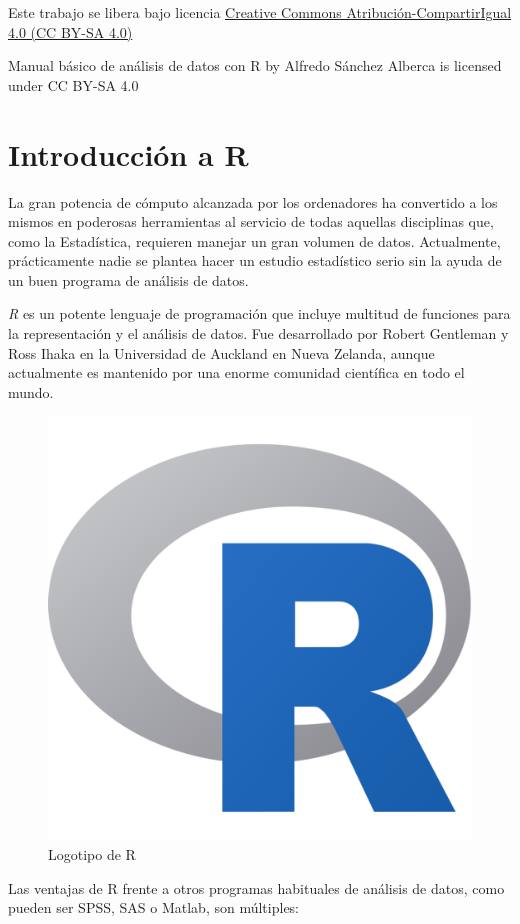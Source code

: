 \documentclass[
]{book}
\theoremstyle{definition}
\theoremstyle{definition}
\theoremstyle{definition}
\theoremstyle{definition}
\theoremstyle{remark}
\begin{document}
Este trabajo se libera bajo licencia \href{https://creativecommons.org/licenses/by-sa/4.0/deed.es}{Creative Commons Atribución-CompartirIgual 4.0 (CC BY-SA 4.0)}

Manual básico de análisis de datos con R by Alfredo Sánchez Alberca is licensed under CC BY-SA 4.0

\hypertarget{introducciuxf3n-a-r}{%
\chapter{Introducción a R}\label{introducciuxf3n-a-r}}

La gran potencia de cómputo alcanzada por los ordenadores ha convertido a los mismos en poderosas herramientas al
servicio de todas aquellas disciplinas que, como la Estadística, requieren manejar un gran volumen de datos.
Actualmente, prácticamente nadie se plantea hacer un estudio estadístico serio sin la ayuda de un buen programa de
análisis de datos.

\emph{R} es un potente lenguaje de programación que incluye multitud de funciones para la representación y el análisis de
datos.
Fue desarrollado por Robert Gentleman y Ross Ihaka en la Universidad de Auckland en Nueva Zelanda, aunque actualmente es mantenido por una enorme comunidad científica en todo el mundo.

\begin{figure}

{\centering \includegraphics[width=0.25\linewidth]{img/Rlogo} 

}

\caption{Logotipo de R}\label{fig:rlogo}
\end{figure}

Las ventajas de R frente a otros programas habituales de análisis de datos, como pueden ser SPSS, SAS o Matlab, son múltiples:
\end{document}

